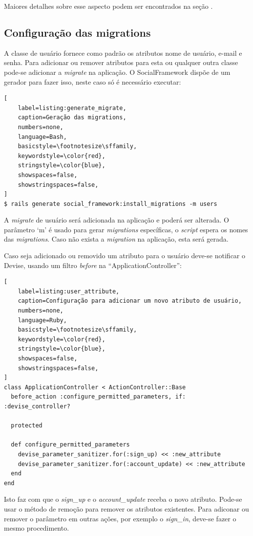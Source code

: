 Maiores detalhes sobre esse aspecto podem ser encontrados na seção .

\subsection{Configuração das migrations}
\label{configuracao_das_migrations}

A classe de usuário fornece como padrão os atributos nome de usuário, e-mail e senha. Para adicionar ou remover atributos para esta ou qualquer outra classe pode-se adicionar a \textit{migrate} na aplicação. O SocialFramework dispõe de um gerador para fazer isso, neste caso só é necessário executar:

\begin{lstlisting}[
    label=listing:generate_migrate,
    caption=Geração das migrations,
    numbers=none,
    language=Bash,
    basicstyle=\footnotesize\sffamily,
    keywordstyle=\color{red},
    stringstyle=\color{blue},
    showspaces=false,
    showstringspaces=false,
]
$ rails generate social_framework:install_migrations -m users
\end{lstlisting}

A \textit{migrate} de usuário será adicionada na aplicação e poderá ser alterada. O parâmetro `m' é usado para gerar \textit{migrations} específicas, o \textit{script} espera os nomes das \textit{migrations}. Caso não exista a \textit{migration} na aplicação, esta será gerada.

Caso seja adicionado ou removido um atributo para o usuário deve-se notificar o Devise, usando um filtro \textit{before} na ``ApplicationController'':

\begin{lstlisting}[
    label=listing:user_attribute,
    caption=Configuração para adicionar um novo atributo de usuário,
    numbers=none,
    language=Ruby,
    basicstyle=\footnotesize\sffamily,
    keywordstyle=\color{red},
    stringstyle=\color{blue},
    showspaces=false,
    showstringspaces=false,
]
class ApplicationController < ActionController::Base
  before_action :configure_permitted_parameters, if: :devise_controller?

  protected

  def configure_permitted_parameters
    devise_parameter_sanitizer.for(:sign_up) << :new_attribute
    devise_parameter_sanitizer.for(:account_update) << :new_attribute
  end
end
\end{lstlisting}

Isto faz com que o \textit{sign\_up} e o \textit{account\_update} receba o novo atributo. Pode-se usar o método de remoção para remover os atributos existentes. Para adiconar ou remover o parâmetro em outras ações, por exemplo o \textit{sign\_in}, deve-se fazer o mesmo procedimento.

